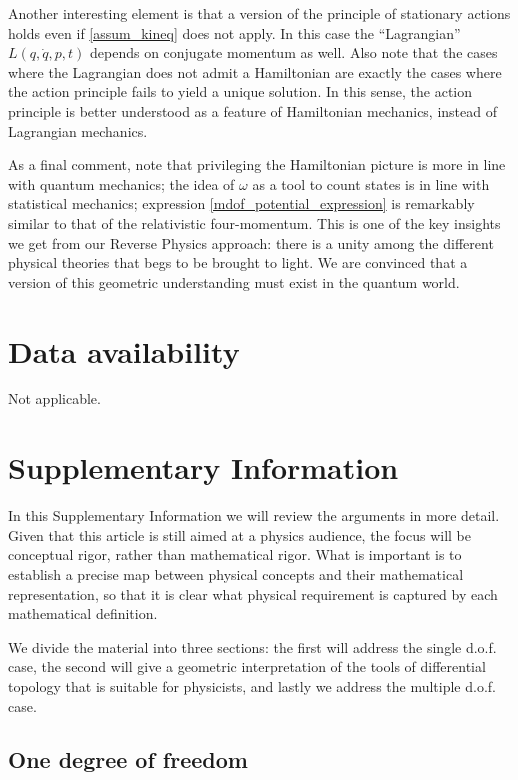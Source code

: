 \documentclass[fleqn,10pt]{wlscirep}
\begin{document}
Another interesting element is that a version of the principle of stationary actions holds even if \ref{assum_kineq} does not apply. In this case the ``Lagrangian'' $L(q,\dot{q},p,t)$ depends on conjugate momentum as well. Also note that the cases where the Lagrangian does not admit a Hamiltonian are exactly the cases where the action principle fails to yield a unique solution. In this sense, the action principle is better understood as a feature of Hamiltonian mechanics, instead of Lagrangian mechanics\cite{souriau1970structure, arnold1989mathematical}.

As a final comment, note that privileging the Hamiltonian picture is more in line with quantum mechanics; the idea of $\omega$ as a tool to count states is in line with statistical mechanics; expression \ref{mdof_potential_expression} is remarkably similar to that of the relativistic four-momentum. This is one of the key insights we get from our Reverse Physics approach: there is a unity among the different physical theories that begs to be brought to light. We are convinced that a version of this geometric understanding must exist in the quantum world.

\vspace{-1mm}
\section*{Data availability}
Not applicable.



\newpage
\section*{Supplementary Information}
\setcounter{page}{1}

In this Supplementary Information we will review the arguments in more detail. Given that this article is still aimed at a physics audience, the focus will be conceptual rigor, rather than mathematical rigor. What is important is to establish a precise map between physical concepts and their mathematical representation, so that it is clear what physical requirement is captured by each mathematical definition.

We divide the material into three sections: the first will address the single d.o.f. case, the second will give a geometric interpretation of the tools of differential topology that is suitable for physicists, and lastly we address the multiple d.o.f. case.

\subsection*{One degree of freedom}
\end{document}
